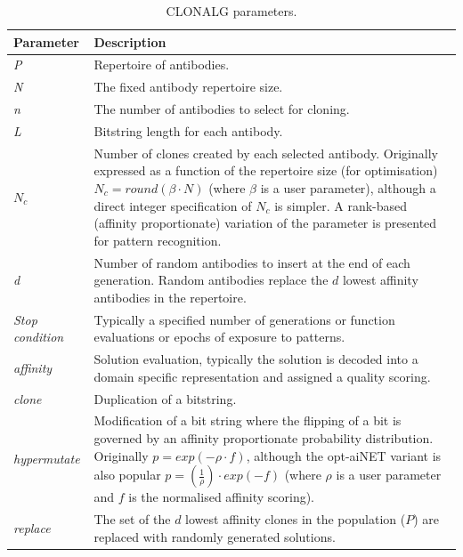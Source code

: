 \begin{table}[ht]
	\centering\small
		\begin{tabularx}{\textwidth}{lX}
		\toprule
		\textbf{Parameter} & \textbf{Description} \\ 
		\toprule
		\emph{P} & Repertoire of antibodies. \\ 
		\midrule
		\emph{N} & The fixed antibody repertoire size. \\ 
		\midrule
		\emph{n} & The number of antibodies to select for cloning. \\ 
		\midrule
		\emph{L} & Bitstring length for each antibody. \\ 
		\midrule
		$N_c$ & Number of clones created by each selected antibody. Originally expressed as a function of the repertoire size (for optimisation) $N_c=round(\beta \cdot N)$ (where $\beta$ is a user parameter), although a direct integer specification of $N_c$ is simpler. A rank-based (affinity proportionate) variation of the parameter is presented for pattern recognition. \\ 
		\midrule
		\emph{d} & Number of random antibodies to insert at the end of each generation. Random antibodies replace the $d$ lowest affinity antibodies in the repertoire. \\ 
		\midrule
		\emph{Stop condition} & Typically a specified number of generations or function evaluations or epochs of exposure to patterns. \\ 
		\midrule
		\emph{affinity} & Solution evaluation, typically the solution is decoded into a domain specific representation and assigned a quality scoring.  \\ 
		\midrule
		\emph{clone} & Duplication of a bitstring.  \\ 
		\midrule
		\emph{hypermutate} & Modification of a bit string where the flipping of a bit is governed by an affinity proportionate probability distribution. Originally $p=exp(-\rho \cdot f)$, although the opt-aiNET variant is also popular $p=(\frac{1}{\rho}) \cdot exp(-f)$ (where $\rho$ is a user parameter and $f$ is the normalised affinity scoring).  \\ 
		\midrule
		\emph{replace} & The set of the $d$ lowest affinity clones in the population ($P$) are replaced with randomly generated solutions. \\
		\bottomrule
		\end{tabularx}		
	\caption{CLONALG parameters.}
	\label{tab:cs:algorithms:clonalgparameters}
\end{table}

